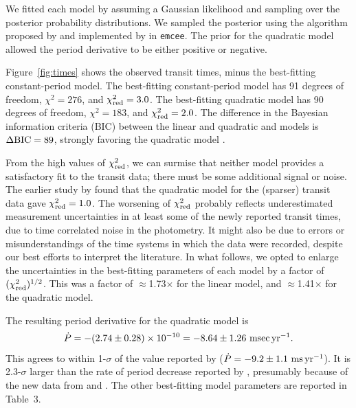 \documentclass[12pt,twocolumn,tighten]{aastex62}
\begin{document}
We fitted each model by assuming a Gaussian likelihood and sampling
over the posterior probability distributions.  We sampled the
posterior using the algorithm proposed by
\citet{goodman_ensemble_2010} and implemented by
\citet{foreman-mackey_emcee_2013} in \texttt{emcee}.  The prior for
the quadratic model allowed the period derivative to be either
positive or negative.

Figure~\ref{fig:times} shows the observed transit times, minus the
best-fitting constant-period model.  The best-fitting constant-period
model has 91 degrees of freedom, $\chi^2 = 276$, and $\chi^2_{\rm
red}=3.0$.  The best-fitting quadratic model has 90 degrees of
freedom, $\chi^2 = 183$, and $\chi^2_{\rm red}=2.0$.  The difference
in the Bayesian information criteria (BIC) between the linear and
quadratic and models is $\Delta {\rm BIC} = 89$, strongly favoring the
quadratic model \citep{kass_bayes_1995}.

From the high values of $\chi^2_{\rm red}$, we can surmise that
neither model provides a satisfactory fit to the transit data; there
must be some additional signal or noise.  The earlier study by
 found that the quadratic model for the
(sparser) transit data gave $\chi^2_{\rm red}=1.0$.  The worsening of
$\chi^2_{\rm red}$ probably reflects underestimated measurement
uncertainties in at least some of the newly reported transit times,
due to time correlated noise in the photometry. It might also be due
to errors or misunderstandings of the time systems in which the data
were recorded, despite our best efforts to interpret the literature.
In what follows, we opted to enlarge the uncertainties in the
best-fitting parameters of each model by a factor of $(\chi^2_{\rm
red})^{1/2}$.  This was a factor of $\approx$1.73$\times$ for the
linear model, and $\approx$1.41$\times$ for the quadratic model.

The resulting period derivative for the quadratic model is 
\begin{equation}
\dot{P}
  = - (2.74 \pm 0.28)\times 10^{-10}
  = - 8.64 \pm 1.26~{\rm msec}\,{\rm yr}^{-1}.
  \label{eq:dP_dt_obs}
\end{equation}
This agrees to within 1-$\sigma$ of the value reported by
\citet{southworth_transit_2019} ($\dot{P} = - 9.2 \pm 1.1~{\rm
ms}\,{\rm yr}^{-1}$).  It is 2.3-$\sigma$ larger than the rate of
period decrease reported by , presumably because of the new
data from \citeauthor{southworth_transit_2019} and
\citeauthor{baluev_2019}. The other best-fitting model parameters are
reported in Table~3.
\end{document}
